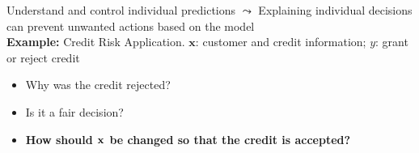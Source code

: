 \documentclass[11pt,compress,t,notes=noshow, aspectratio=169, xcolor=table]{beamer}
\begin{document}
\begin{frame}{Understand and control individual predictions}
    $\leadsto$ Explaining individual decisions can prevent unwanted actions based on the model \\
    \medskip
    \textbf{Example:} Credit Risk Application. $\textbf{x}$: customer and credit information; $y$: grant or reject credit
	
	\begin{itemize}
		\item Why was the credit rejected?
		\item Is it a fair decision?
		\item \textbf{How should $\xv$ be changed so that the credit is accepted?}
	\end{itemize}
	
\end{frame}

\end{document}
